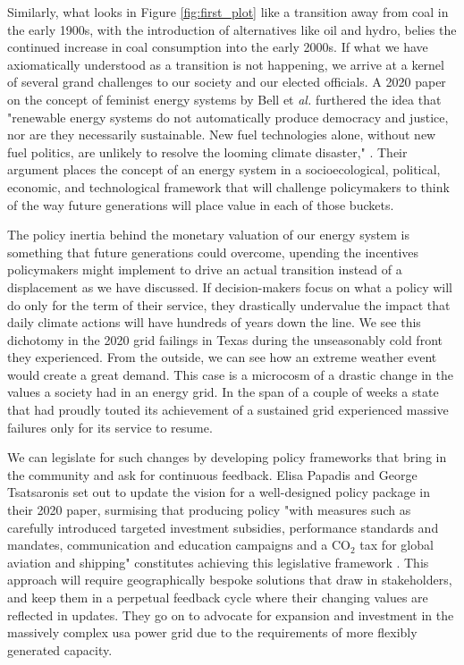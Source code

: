 Similarly, what looks in Figure \ref{fig:first_plot} like a transition away from coal in the early 1900s, with the introduction of alternatives like oil and hydro, belies the continued increase in coal consumption into the early 2000s. If what we have axiomatically understood as a transition is not happening, we arrive at a kernel of several grand challenges to our society and our elected officials. A 2020 paper on the concept of feminist energy systems by Bell et \textit{al.} furthered the idea that "renewable energy systems do not automatically produce democracy and justice, nor are they necessarily sustainable. New fuel technologies alone, without new fuel politics, are unlikely to resolve the looming climate disaster," \cite{bell_toward_2020}. Their argument places the concept of an energy system in a socioecological, political, economic, and technological framework that will challenge policymakers to think of the way future generations will place value in each of those buckets.

The policy inertia behind the monetary valuation of our energy system is something that future generations could overcome, upending the incentives policymakers might implement to drive an actual transition instead of a displacement as we have discussed. If decision-makers focus on what a policy will do only for the term of their service, they drastically undervalue the impact that daily climate actions will have hundreds of years down the line. We see this dichotomy in the 2020 grid failings in Texas during the unseasonably cold front they experienced. From the outside, we can see how an extreme weather event would create a great demand. This case is a microcosm of a drastic change in the values a society had in an energy grid. In the span of a couple of weeks a state that had proudly touted its achievement of a sustained grid \cite{texas_ercot_nodate} experienced massive failures only for its service to resume.

We can legislate for such changes by developing policy frameworks that bring in the community and ask for continuous feedback. Elisa Papadis and George Tsatsaronis set out to update the vision for a well-designed policy package in their 2020 paper, surmising that producing policy "with measures such as carefully introduced targeted investment subsidies, performance standards and mandates, communication and education campaigns and a CO$_2$ tax for global aviation and shipping" constitutes achieving this legislative framework \cite{papadis_challenges_2020}. This approach will require geographically bespoke solutions that draw in stakeholders, and keep them in a perpetual feedback cycle where their changing values are reflected in updates. They go on to advocate for expansion and investment in the massively complex \gls{usa} power grid due to the requirements of more flexibly generated capacity.


